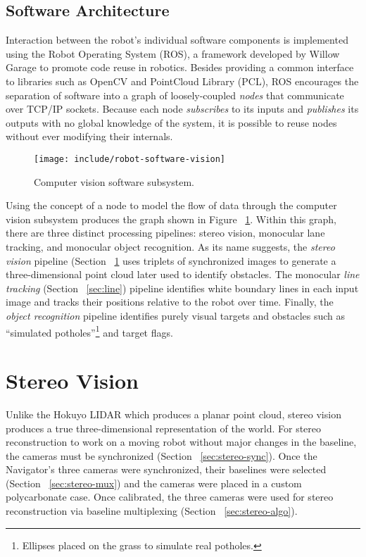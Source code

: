\documentclass[twocolumn,11pt]{article}
\begin{document}
\subsection{Software Architecture}
\label{sec:robot-software}
Interaction between the robot's individual software components is implemented
using the Robot Operating System (ROS), a framework developed by Willow Garage
to promote code reuse in robotics. Besides providing a common interface to
libraries such as OpenCV and PointCloud Library (PCL), ROS encourages the
separation of software into a graph of loosely-coupled \textit{nodes} that
communicate over TCP/IP sockets. Because each node \textit{subscribes} to its
inputs and \textit{publishes} its outputs with no global knowledge of the
system, it is possible to reuse nodes without ever modifying their internals.

\begin{figure}
	\centering
	\texttt{[image: include/robot-software-vision]}
	\caption{Computer vision software subsystem.}
	\label{fig:robot-vision}
\end{figure}

Using the concept of a node to model the flow of data through the computer
vision subsystem produces the graph shown in Figure ~\ref{fig:robot-vision}.
Within this graph, there are three distinct processing pipelines: stereo vision,
monocular lane tracking, and monocular object recognition. As its name
suggests, the \textit{stereo vision} pipeline (Section ~\ref{sec:stereo} uses
triplets of synchronized images to generate a three-dimensional point cloud
later used to identify obstacles. The monocular \textit{line tracking} (Section
~\ref{sec:line}) pipeline identifies white boundary lines in each input image
and tracks their positions relative to the robot over time. Finally, the
\textit{object recognition} pipeline identifies purely visual targets and
obstacles such as ``simulated potholes''\footnote{Ellipses placed on the grass
to simulate real potholes.} and target flags.

\section{Stereo Vision}
\label{sec:stereo}
Unlike the Hokuyo LIDAR which produces a planar point cloud, stereo vision
produces a true three-dimensional representation of the world. For stereo
reconstruction to work on a moving robot without major changes in the baseline,
the cameras must be synchronized (Section ~\ref{sec:stereo-sync}). Once the
Navigator's three cameras were synchronized, their baselines were selected
(Section ~\ref{sec:stereo-mux}) and the cameras were placed in a custom
polycarbonate case. Once calibrated, the three cameras were used for stereo
reconstruction via baseline multiplexing (Section ~\ref{sec:stereo-algo}).
\end{document}
